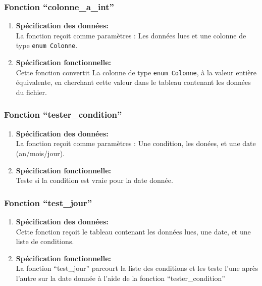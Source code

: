 \subsubsection{Fonction ``colonne\_a\_int''}
\begin{enumerate}[label=\textbf{\Alph* --}]
	\item \textbf{Spécification des données: \\}
		La fonction reçoit comme paramètres : Les données lues et une colonne de type \lstinline$enum Colonne$.
    \item \textbf{Spécification fonctionnelle: \\}
    Cette fonction convertit La colonne de type \lstinline$enum Colonne$, à la valeur entière équivalente, en
    cherchant cette valeur dans le tableau contenant les données du fichier.
 \end{enumerate}	
 
\subsubsection{Fonction ``tester\_condition''}
\begin{enumerate}[label=\textbf{\Alph* --}]
	\item \textbf{Spécification des données: \\}
		La fonction reçoit comme paramètres : Une condition, les donées, et une date (an/mois/jour).
    \item \textbf{Spécification fonctionnelle: \\}
    Teste si la condition est vraie pour la date donnée.
 \end{enumerate}	
 
 \subsubsection{Fonction ``test\_jour''}
\begin{enumerate}[label=\textbf{\Alph* --}]
	\item \textbf{Spécification des données: \\}
		Cette fonction reçoit le tableau contenant les données lues, une date, et une liste de 
		conditions.
    \item \textbf{Spécification fonctionnelle: \\}
    La fonction ``test\_jour'' parcourt la liste des conditions et les teste l'une après l'autre 
    sur la date donnée à l'aide de la fonction ``tester\_condition''
 \end{enumerate}	
 
